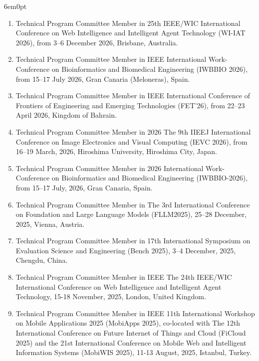 \documentclass[11pt,a4paper]{moderncv}
\begin{document}
\begin{adjustwidth}{6em}{0pt}
\begin{enumerate}
		\item Technical Program Committee Member in 25th IEEE/WIC International Conference on Web Intelligence and Intelligent Agent Technology (WI-IAT 2026), from 3–6 December 2026, Brisbane, Australia.
		
		\item Technical Program Committee Member in IEEE International Work-Conference on Bioinformatics and Biomedical Engineering (IWBBIO 2026), from 15–17 July 2026, Gran Canaria (Meloneras), Spain.
		
		\item Technical Program Committee Member in IEEE International Conference of Frontiers of Engineering and Emerging Technologies (FET’26), from 22–23 April 2026, Kingdom of Bahrain.
		
		\item Technical Program Committee Member in 2026 The 9th IIEEJ International Conference on Image Electronics and Visual Computing (IEVC 2026), from 16–19 March, 2026, Hiroshima University, Hiroshima City, Japan.
		
		\item Technical Program Committee Member in 2026 International Work-Conference on Bioinformatics and Biomedical Engineering (IWBBIO-2026), from 15–17 July, 2026, Gran Canaria, Spain.
		
		\item Technical Program Committee Member in The 3rd International Conference on Foundation and Large Language Models (FLLM2025), 25–28 December, 2025, Vienna, Austria.
		
		\item Technical Program Committee Member in 17th International Symposium on Evaluation Science and Engineering (Bench 2025), 3–4 December, 2025, Chengdu, China.
		
		\item Technical Program Committee Member in IEEE The 24th IEEE/WIC International Conference on Web Intelligence and Intelligent Agent Technology, 15-18 November, 2025, London, United Kingdom.
		
		\item Technical Program Committee Member in IEEE 11th International Workshop on Mobile Applications 2025 (MobiApps 2025), co-located with The 12th International Conference on Future Internet of Things and Cloud (FiCloud 2025) and the 21st International Conference on Mobile Web and Intelligent Information Systems (MobiWIS 2025), 11-13 August, 2025, Istanbul, Turkey.
		

\end{enumerate}
\end{adjustwidth}
\end{document}
